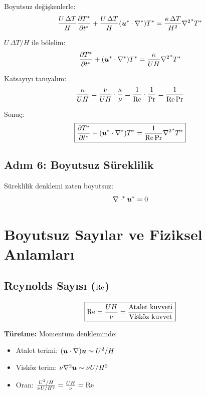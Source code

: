 Boyutsuz değişkenlerle:
\begin{equation}
    \frac{U\,\Delta T}{H}\frac{\partial T^*}{\partial t^*} + \frac{U\,\Delta T}{H}(\bm{u}^*\cdot\nabla^*)T^* = \frac{\kappa\,\Delta T}{H^2}{\nabla^2}^* T^*
\end{equation}

$U\,\Delta T/H$ ile bölelim:
\begin{equation}
    \frac{\partial T^*}{\partial t^*} + (\bm{u}^*\cdot\nabla^*)T^* = \frac{\kappa}{UH}{\nabla^2}^* T^*
\end{equation}

Katsayıyı tanıyalım:
\begin{equation}
    \frac{\kappa}{UH} = \frac{\nu}{UH}\cdot\frac{\kappa}{\nu} = \frac{1}{\mathrm{Re}}\cdot\frac{1}{\mathrm{Pr}} = \frac{1}{\mathrm{Re}\,\mathrm{Pr}}
\end{equation}

Sonuç:
\begin{equation}
    \boxed{\frac{\partial T^*}{\partial t^*} + (\bm{u}^*\cdot\nabla^*)T^* = \frac{1}{\mathrm{Re}\,\mathrm{Pr}}{\nabla^2}^* T^*}
    \label{eq:nondim_energy}
\end{equation}

\subsection{Adım 6: Boyutsuz Süreklilik}

Süreklilik denklemi zaten boyutsuz:
\begin{equation}
    \nabla \cdot^*\bm{u}^* = 0
    \label{eq:nondim_continuity}
\end{equation}


\section{Boyutsuz Sayılar ve Fiziksel Anlamları}
\label{sec:boyutsuz_sayilar}

\subsection{Reynolds Sayısı ($\mathrm{Re}$)}
\label{subsec:reynolds}

\begin{equation}
    \boxed{\mathrm{Re} = \frac{UH}{\nu} = \frac{\text{Atalet kuvveti}}{\text{Visköz kuvvet}}}
    \label{eq:reynolds}
\end{equation}

\textbf{Türetme:} Momentum denkleminde:
\begin{itemize}
    \item Atalet terimi: $(\bm{u}\cdot\nabla)\bm{u} \sim U^2/H$
    \item Visköz terim: $\nu\nabla^2\bm{u} \sim \nu U/H^2$
    \item Oran: $\frac{U^2/H}{\nu U/H^2} = \frac{UH}{\nu} = \mathrm{Re}$
\end{itemize}

